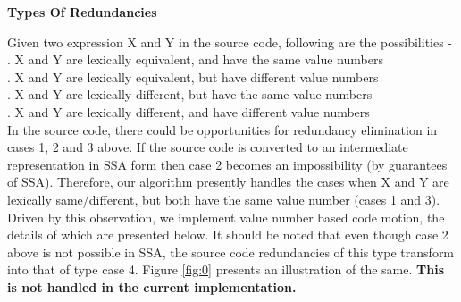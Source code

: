 \documentclass[10pt,twoside]{report}
\begin{document}
\begin{flushleft}
\textbf{\large{Types Of Redundancies}}
\end{flushleft}
Given two expression X and Y in the source code, following are the possibilities - \\
. X and Y are lexically equivalent, and have the same value numbers \\
. X and Y are lexically equivalent, but have different value numbers \\
. X and Y are lexically different, but have the same value numbers \\
. X and Y are lexically different, and have different value numbers \\
In the source code, there could be opportunities for redundancy elimination in
cases 1, 2 and 3 above. If the source code is converted to an intermediate
representation in SSA form then case 2 becomes an impossibility (by guarantees of SSA). Therefore,
               our algorithm presently handles the cases when X and Y are
               lexically same/different, but both have the same value number (cases 1 and 3).
               Driven by this observation, we implement value number based code
               motion, the details of which are presented below. It should be
               noted that even though case 2 above is not possible in SSA,
               the source code redundancies  of this type transform into that
               of type case 4. Figure \ref{fig:0} presents an illustration of the same. \textbf{This is not handled
               in the current implementation.} 
\end{document}

